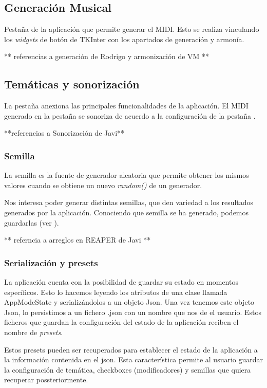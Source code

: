 \subsection{Generación Musical}
Pestaña de la aplicación que permite generar el MIDI. Esto se realiza vinculando los \textit{widgets} de botón de TKInter con los apartados de generación y armonía.

** referencias a generación de Rodrigo y armonización de VM **

\subsection{Temáticas y sonorización}
\label{subsec:TK:TematicasYSonorizacion}
La pestaña \tematicTabName{} anexiona las principales funcionalidades de la aplicación. El MIDI generado en la pestaña \generationTabName{} se sonoriza de acuerdo a la configuración de la pestaña \tematicTabName{}. 

**referencias a Sonorización de Javi**

\subsubsection{Semilla}
La semilla es la fuente de generador aleatoria que permite obtener los mismos valores cuando se obtiene un nuevo \textit{random()} de un generador.

Nos interesa poder generar distintas semillas, que den variedad a los resultados generados por la aplicación. Conociendo que semilla se ha generado, podemos guardarlas (ver ).

** referncia a arreglos en REAPER de Javi **

\subsubsection{Serialización y presets}
\label{subsub:TK:serializacionYPresets}
La aplicación cuenta con la posibilidad de guardar su estado en momentos específicos. Esto lo hacemos leyendo los atributos de una clase llamada AppModeState y serializándolos a un objeto Json. Una vez tenemos este objeto Json, lo persistimos a un fichero .json con un nombre que nos de el usuario. Estos ficheros que guardan la configuración del estado de la aplicación reciben el nombre de \textit{presets}. 

Estos presets pueden ser recuperados para establecer el estado de la aplicación a la información contenida en el json. Esta característica permite al usuario guardar la configuración de temática, checkboxes (modificadores) y semillas que quiera recuperar possteriormente.

